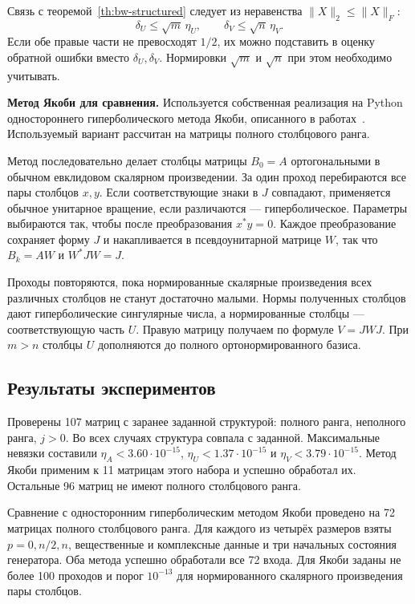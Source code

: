 \documentclass[a4paper,12pt]{article}
\theoremstyle{csstyle}
\begin{document}
Связь с теоремой~\ref{th:bw-structured} следует из неравенства
$\|X\|_2\le\|X\|_F$:
\[
\delta_U\le\sqrt m\,\eta_U,\qquad
\delta_V\le\sqrt n\,\eta_V.
\]
Если обе правые части не превосходят $1/2$, их можно подставить
в оценку обратной ошибки вместо $\delta_U,\delta_V$.
Нормировки $\sqrt m$ и $\sqrt n$ при этом необходимо учитывать.

\textbf{Метод Якоби для сравнения.}
Используется собственная реализация на Python одностороннего
гиперболического метода Якоби, описанного в работах~\cite{Jacobi,HariNovakovic2026}.
Используемый вариант рассчитан на матрицы полного столбцового ранга.

Метод последовательно делает столбцы матрицы $B_0=A$
ортогональными в обычном евклидовом скалярном произведении.
За один проход перебираются все пары столбцов $x,y$.
Если соответствующие знаки в $J$ совпадают, применяется обычное унитарное вращение,
если различаются --- гиперболическое. Параметры выбираются так, чтобы
после преобразования $x^*y=0$. 
Каждое преобразование сохраняет форму $J$ и накапливается в псевдоунитарной матрице $W$,
так что $B_k=AW$ и $W^*JW=J$.

Проходы повторяются, пока нормированные скалярные произведения
всех различных столбцов не станут достаточно малыми.
Нормы полученных столбцов дают гиперболические сингулярные числа,
а нормированные столбцы --- соответствующую часть $U$.
Правую матрицу получаем по формуле $V=JWJ$.
При $m>n$ столбцы $U$ дополняются до полного ортонормированного базиса.

\subsection{Результаты экспериментов}
Проверены 107 матриц с заранее заданной структурой: полного ранга, неполного
ранга, $j>0$.
Во всех случаях структура
совпала с заданной. Максимальные невязки составили
$\eta_A<3.60\cdot10^{-15}$, $\eta_U<1.37\cdot10^{-15}$ и
$\eta_V<3.79\cdot10^{-15}$.
Метод Якоби применим к 11 матрицам этого набора и успешно обработал их.
Остальные 96 матриц не имеют полного столбцового ранга.

Сравнение с односторонним гиперболическим методом Якоби проведено на 72 матрицах полного столбцового ранга. Для каждого из четырёх размеров
взяты $p=0,n/2,n$, вещественные и комплексные данные и три начальных
состояния генератора. Оба метода успешно обработали все 72 входа.
Для Якоби заданы не более 100 проходов и порог $10^{-13}$ для
нормированного скалярного произведения пары столбцов.
\end{document}
